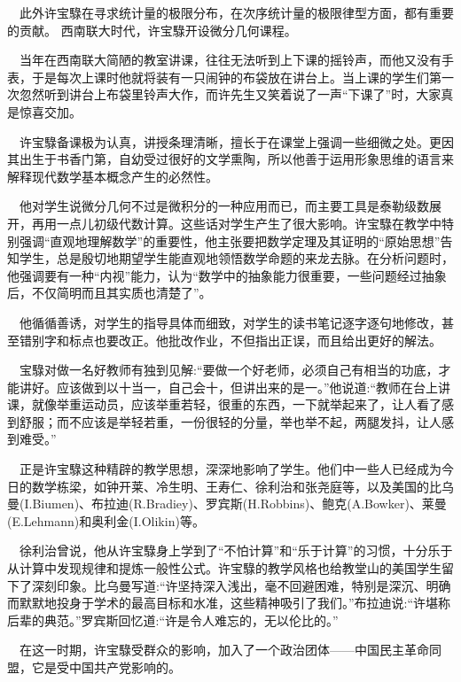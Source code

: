 \begin{frame}
	$\quad$此外许宝騄在寻求统计量的极限分布，在次序统计量的极限律型方面，都有重要的贡献。
	西南联大时代，许宝騄开设微分几何课程。
	
	$\quad$当年在西南联大简陋的教室讲课，往往无法听到上下课的摇铃声，而他又没有手表，于是每次上课时他就将装有一只闹钟的布袋放在讲台上。当上课的学生们第一次忽然听到讲台上布袋里铃声大作，而许先生又笑着说了一声“下课了”时，大家真是惊喜交加。
	
	$\quad$许宝騄备课极为认真，讲授条理清晰，擅长于在课堂上强调一些细微之处。更因其出生于书香门第，自幼受过很好的文学熏陶，所以他善于运用形象思维的语言来解释现代数学基本概念产生的必然性。 
	
	$\quad$他对学生说微分几何不过是微积分的一种应用而已，而主要工具是泰勒级数展开，再用一点儿初级代数计算。这些话对学生产生了很大影响。许宝騄在教学中特别强调“直观地理解数学”的重要性，他主张要把数学定理及其证明的“原始思想”告知学生，总是殷切地期望学生能直观地领悟数学命题的来龙去脉。在分析问题时，他强调要有一种“内视”能力，认为“数学中的抽象能力很重要，一些问题经过抽象后，不仅简明而且其实质也清楚了”。
\end{frame}

\begin{frame}
	$\quad$他循循善诱，对学生的指导具体而细致，对学生的读书笔记逐字逐句地修改，甚至错别字和标点也要改正。他批改作业，不但指出正误，而且给出更好的解法。
	
	$\quad$宝騄对做一名好教师有独到见解:“要做一个好老师，必须自己有相当的功底，才能讲好。应该做到以十当一，自己会十，但讲出来的是一。”他说道:“教师在台上讲课，就像举重运动员，应该举重若轻，很重的东西，一下就举起来了，让人看了感到舒服；而不应该是举轻若重，一份很轻的分量，举也举不起，两腿发抖，让人感到难受。”
	
	$\quad$正是许宝騄这种精辟的教学思想，深深地影响了学生。他们中一些人已经成为今日的数学栋梁，如钟开莱、冷生明、王寿仁、徐利治和张尧庭等，以及美国的比乌曼(I.Biumen)、布拉迪(R.Bradiey)、罗宾斯(H.Robbins)、鲍克(A.Bowker)、莱曼(E.Lehmann)和奥利金(I.Olikin)等。
\end{frame}

\begin{frame}
	$\quad$徐利治曾说，他从许宝騄身上学到了“不怕计算”和“乐于计算”的习惯，十分乐于从计算中发现规律和提炼一般性公式。许宝騄的教学风格也给教堂山的美国学生留下了深刻印象。比乌曼写道:“许坚持深入浅出，毫不回避困难，特别是深沉、明确而默默地投身于学术的最高目标和水准，这些精神吸引了我们。”布拉迪说:“许堪称后辈的典范。”罗宾斯回忆道:“许是令人难忘的，无以伦比的。” 
	
	$\quad$在这一时期，许宝騄受群众的影响，加入了一个政治团体——中国民主革命同盟，它是受中国共产党影响的。
	
\end{frame}

